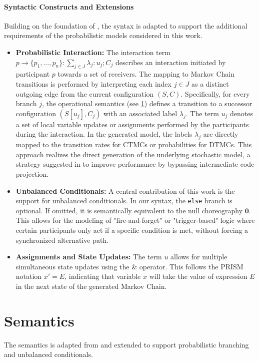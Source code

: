 \paragraph{Syntactic Constructs and Extensions}
Building on the foundation of \textcite{CarboneVeschetti}, the syntax is adapted to support the additional requirements of the probabilistic models considered in this work.

\begin{itemize}
	\item \textbf{Probabilistic Interaction:} The interaction term $p \to \{p_1, \dots, p_n\} : \sum_{j \in J} \lambda_j : u_j ; C_j$ describes an interaction initiated by participant $p$ towards a set of receivers. The mapping to Markov Chain transitions is performed by interpreting each index $j \in J$ as a distinct outgoing edge from the current configuration $(S,C)$. Specifically, for every branch $j$, the operational semantics (see \cref{sec:semantics}) defines a transition to a successor configuration $(S[u_{j}],C_{j})$ with an associated label $\lambda_{j}$. The term $u_{j}$ denotes a set of local variable updates or assignments performed by the participants during the interaction. In the generated model, the labels $\lambda_{j}$ are directly mapped to the transition rates for CTMCs or probabilities for DTMCs. This approach realizes the direct generation of the underlying stochastic model, a strategy suggested in \cite{CarboneVeschetti} to improve performance by bypassing intermediate code projection.
	\item \textbf{Unbalanced Conditionals:} A central contribution of this work is the support for unbalanced conditionals. In our syntax, the \texttt{else} branch is optional. If omitted, it is semantically equivalent to the null choreography $\mathbf{0}$. This allows for the modeling of "fire-and-forget" or "trigger-based" logic where certain participants only act if a specific condition is met, without forcing a synchronized alternative path.
	\item \textbf{Assignments and State Updates:} The term $u$ allows for multiple simultaneous state updates using the $\&$ operator. This follows the PRISM notation $x' = E$, indicating that variable $x$ will take the value of expression $E$ in the next state of the generated Markov Chain.
\end{itemize}

\section{Semantics}
\label{sec:semantics}
The semantics is adapted from \cite{CarboneVeschetti} and extended to support probabilistic branching and unbalanced conditionals.

